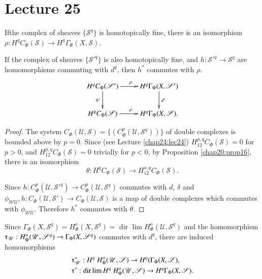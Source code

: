 \chapter{Lecture 25}\label{chap25:lec25} %

\begin{proposition}\label{chap25:prop18}%
If\pageoriginale the complex of sheaves $\{\mathscr{S}^q \}$ is homotopically
    fine, there is an isomorphism $\rho : H^q C_\Phi (\mathscr{S})
    \rightarrow H^q \Gamma_{\Phi} (X,\mathscr{S})$. 

If the complex of sheaves $\{\mathscr{S}'^{q} \}$ is also
  homotopically fine, and $h : \mathscr{S}'^{q} \rightarrow
  \mathscr{S}^q$ are homomorphisms commuting with $d^q$, then $h^*$
  commutes with $\rho$. 
\[
\xymatrix{
H^qC_{\Phi} (\mathscr{S}') \ar[r]^{\rho} \ar[d]_{h^{\ast}} &
H^q\Gamma_{\Phi} (X,\mathscr{S}') \ar[d]^{d^{\ast}}\\
H^q C_{\Phi} (\mathscr{S}) \ar[r]^{\rho} &
H^q\Gamma_{\Phi}(X,\mathscr{S}). 
}
\]
\end{proposition}

\begin{proof}
The system $C_\Phi (\mathscr{U},\mathscr{S}) = \{ (C^p_\Phi
(\mathscr{U}, \mathscr{S}^q)) \}$ of double complexes is bounded above
by $p = 0$. Since (see Lecture \ref{chap24:lec24}) $H^{p,q}_{12}  C_\Phi
(\mathscr{S}) = 0$ for $p > 0$, and $H^{p,q}_{12}  C_\Phi
(\mathscr{S}) = 0$ trivially for $p < 0$, by Proposition
\ref{chap20:prop16}, there  is an isomorphism  
$$
\theta : H^q  C_{\Phi} (\mathscr{S}) \rightarrow H^{o,q}_{12} 
C_\Phi (\mathscr{S}). 
$$

Since $h : C^p_\Phi (\mathscr{U},\mathscr{S}'^q) \rightarrow C^p_\Phi
(\mathscr{U}, \mathscr{S}^q)$ commutes with $d$, $\delta$ and
$\phi_{\mathscr{W}\mathscr{U}}, h : C_\Phi (\mathscr{U},\mathscr{S}')
\rightarrow C_\Phi (\mathscr{U}, \mathscr{S})$ is a map of double
complexes which commutes with $\phi_{\mathscr{W}\mathscr{U}}$.
 Therefore $h^*$ commutes with $\theta$.  
\end{proof}

Since $\Gamma_\Phi (X, \mathscr{S}^q) = H^o_\Phi (X,\mathscr{S}^q) =$
dir $\lim H^o_\Phi (\mathscr{U},\mathscr{S}^q)$ and the homomorphism
$\tauup_{\mathscr{U}} : H^o_\Phi (\mathscr{U}, \mathscr{S}^q)
\rightarrow \Gamma_\Phi (X,\mathscr{S}^q)$ commutes with $d^q$, there
are induced homomorphisms 
\begin{align*}
& \tauup^*_{\mathscr{U}} : H^q ~ H^o_{\Phi} (\mathscr{U}, \mathscr{S})
  \rightarrow H^q (\Gamma_{\Phi} (X,\mathscr{S}),\\ 
& \tauup^* : \text{dir} \lim H^q ~ H^o_\Phi
  (\mathscr{U},\mathscr{S})\rightarrow H^q \Gamma_\Phi
  (X,\mathscr{S}). 
\end{align*}\pageoriginale 

